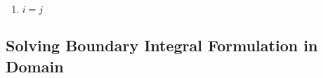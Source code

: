 \documentclass[a4paper,12pt]{article}
\newlength{\intwidth}
\DeclareRobustCommand{\fpint}[2]
   {\mathop{%
      \text{%
        \settowidth{\intwidth}{$\int$}%
        \makebox[0pt][l]{\makebox[\intwidth]{$-$}}%
        $\int_{#1}^{#2}$}}}
\begin{document}
\begin{enumerate}
\begin{align}
{\begin{array}{c}
      \frac{2\nu}{2 \sqrt{\eta^2 + \nu^2}} \frac{1}{\sqrt{\eta^2 + \nu^2}}
    \end {array} \right) \cdot n }=
        \fpint{S_j}{}{ \frac{1}{2\pi} \frac{1}{\eta^2 + \nu^2} \left(\begin{array}{c}
      \nu \\
      \eta
    \end{array}\right) \cdot n}\\
&=  \frac{1}{2\pi} \frac{1}{r^2} \left(\begin{array}{c}
      r \cos\theta \\
      r \sin \theta
    \end{array}\right)
\end{align}






 \item $i=j$
\end{enumerate}





\subsection{Solving Boundary Integral Formulation in Domain}
\end{document}
